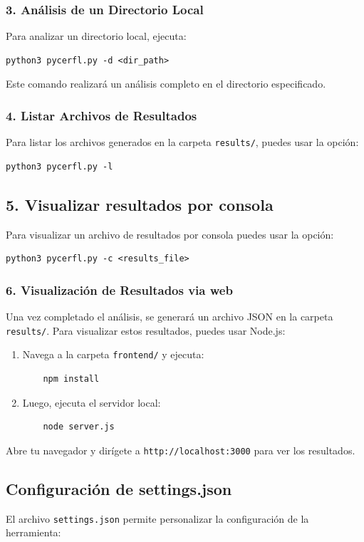 \documentclass[a4paper, 12pt]{book}
\begin{document}
\subsubsection{3. Análisis de un Directorio Local}
Para analizar un directorio local, ejecuta:
\begin{verbatim}
python3 pycerfl.py -d <dir_path>
\end{verbatim}
Este comando realizará un análisis completo en el directorio especificado.

\subsubsection{4. Listar Archivos de Resultados}
Para listar los archivos generados en la carpeta \texttt{results/}, puedes usar la opción:
\begin{verbatim}
python3 pycerfl.py -l
\end{verbatim}

\subsection{5. Visualizar resultados por consola}
Para visualizar un archivo de resultados por consola puedes usar la opción:
\begin{verbatim}
python3 pycerfl.py -c <results_file>
\end{verbatim}
\subsubsection{6. Visualización de Resultados via web}
Una vez completado el análisis, se generará un archivo JSON en la carpeta \texttt{results/}. Para visualizar estos resultados, puedes usar Node.js:
\begin{enumerate}
    \item Navega a la carpeta \texttt{frontend/} y ejecuta:
    \begin{verbatim}
    npm install
    \end{verbatim}
    \item Luego, ejecuta el servidor local:
    \begin{verbatim}
    node server.js
    \end{verbatim}
\end{enumerate}
Abre tu navegador y dirígete a \texttt{http://localhost:3000} para ver los resultados.

\subsection{Configuración de settings.json}
El archivo \texttt{settings.json} permite personalizar la configuración de la herramienta:
\vspace{1em}
\end{document}
